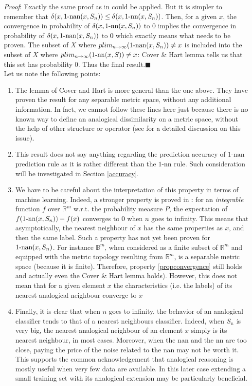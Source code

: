 {\it Proof}:
Exactly the same proof  as in \cite{CovHarTIT67} could be applied.  But it is
simpler to remember that $\delta(x, 1\mbox{-nan}(x,S_n)) \leq \delta(x, 1\mbox{-nn}(x,S_n))$. Then,
for a given $x$, the convergence in probability of $\delta(x,
1\mbox{-nn}(x,S_n))$ to $0$ implies the convergence in probability of $\delta(x,
1\mbox{-nan}(x,S_n))$ to $0$ which exactly means what needs to be proven.
The subset of $X$ where $plim_{n \to \infty}(1\mbox{-nan}(x,S_n))\neq
x$ is included into the subset of $X$ where $plim_{n \to \infty}(1\mbox{-nn}(x,S))\neq x$:
Cover \& Hart lemma tells us that this set has probability $0$. Thus the final
result.\hfill $\blacksquare$\\

Let us note the following points:
\begin{enumerate}
\item The lemma of Cover and Hart is more general than the one above. They have
  proven the result for any separable metric space, without any additional
  information. In fact, we cannot follow these lines here just because there is
  no known way to define an analogical dissimilarity on a metric space, without
  the help of other structure or operator (see \cite{MicBayDelJAIR08} for a
  detailed discussion on this issue).
\item This result does not say anything regarding the prediction accuracy of
  $1\mbox{-nan}$ prediction rule as it is rather different than the
  $1\mbox{-nn}$ rule. Such consideration will be investigated in Section
  \ref{accuracy}.
\item We have to be careful about the interpretation of this property in terms
  of machine learning. Indeed, a stronger property is proved in
  \cite{CovHarTIT67}: for an {\it integrable} function $f$  over $\mathbb{R}^m$
  w.r.t. the probability measure $P$, the expectation of
  $f(1\mbox{-nn}(x,S_n))- f(x)$ converges to 0 when $n$ goes to infinity.
  This means that asymptotically, the nearest neighbour of $x$ has the same
  properties as $x$, and then the same label. Such a property has not yet been
  proven for $1\mbox{-nan}(x, S_n)$.
  For instance $\mathbb{B}^m$, when considered as a finite
  subset of $\mathbb{R}^m$ and equipped with the metric topology resulting from
  $\mathbb{R}^m$, is a separable metric space (because it is finite).
  Therefore, property \ref{propconvergence} still holds and actually even the
  Cover \& Hart lemma holds). However, this does not mean that for a given
  element $x$ the characteristics (i.e. the labels) of its nearest analogical
  neighbour converge to $\dot{x}$
\item Finally, it is clear that when $n$ goes to infinity, the behavior of an
  analogical classifier tends to that of a nearest neighbours classifier.
  Indeed, when $S_n$ is very big, the nearest analogical neighbour of an
  element $x$ simply is its nearest neighbour, in most cases. Moreover, when
  the nan and the nn are too close, paying the price of the noise related to
  the nan may not be worth it. This supports the common acknowledgement that
  analogical reasoning is mostly useful when very few data are available.
    In this later case extending a small training set with its analogical
    extension may be particularly beneficial.




\end{enumerate}
